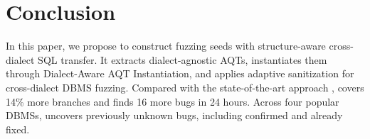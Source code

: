 \documentclass[conference]{IEEEtran}
\begin{document}
\section{Conclusion}
\label{sec:conclusion}
In this paper, we propose \tool{} to construct fuzzing seeds with structure-aware cross-dialect SQL transfer.
It extracts dialect-agnostic AQTs, instantiates them through Dialect-Aware AQT Instantiation, and applies adaptive sanitization for cross-dialect DBMS fuzzing. 
Compared with the state-of-the-art approach \sedar{}, \tool{} covers 14\% more branches and finds 16 more bugs in 24 hours. Across four popular DBMSs, \tool{} uncovers \bugcnt{} previously unknown bugs, including \bugconfirmcnt{} confirmed and \bugfixcnt{} already fixed.






\end{document}

